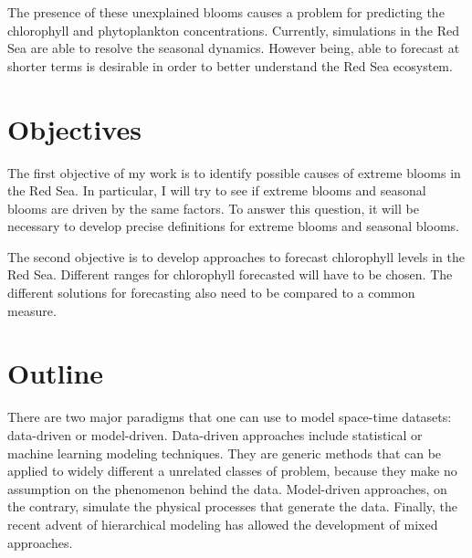 	The presence of these unexplained blooms causes a problem for predicting the chlorophyll and phytoplankton concentrations. Currently, simulations in the Red Sea are able to resolve the seasonal dynamics. However being, able to forecast at shorter terms is desirable in order to better understand the Red Sea ecosystem. 

\section{Objectives}
\label{intro:objectives}
	
	The first objective of my work is to identify possible causes of extreme blooms in the Red Sea. In particular, I will try to see if extreme blooms and seasonal blooms are driven by the same factors. To answer this question, it will be necessary to develop precise definitions for extreme blooms and seasonal blooms. 

	The second objective is to develop approaches to forecast chlorophyll levels in the Red Sea. Different ranges for chlorophyll forecasted will have to be chosen. The different solutions for forecasting also need to be compared to a common measure. 

\section{Outline}
\label{intro:outline}

	There are two major paradigms that one can use to model space-time datasets: data-driven or model-driven. Data-driven approaches include statistical or machine learning modeling techniques. They are generic methods that can be applied to widely different a unrelated classes of problem, because they make no assumption on the phenomenon behind the data. Model-driven approaches, on the contrary, simulate the physical processes that generate the data. Finally, the recent advent of hierarchical modeling has allowed the development of mixed approaches.



